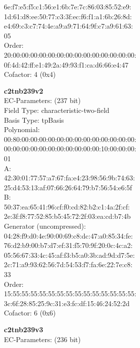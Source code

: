     6e:f7:e5:f5:c1:56:e1:6b:7e:7c:86:03:85:52:e9:\\
    1d:61:d8:ee:50:77:c3:3f:ec:f6:f1:a1:6b:26:8d:\\
    e4:69:c3:c7:74:4e:a9:a9:71:64:9f:c7:a9:61:63:\\
    05\\
Order: \\
    20:00:00:00:00:00:00:00:00:00:00:00:00:00:00:\\
    0f:4d:42:ff:e1:49:2a:49:93:f1:ca:d6:66:e4:47\\
Cofactor:  4 (0x4)\\
\item \textbf{ c2tnb239v2 }\\
EC-Parameters: (237 bit)\\
Field Type: characteristic-two-field\\
Basis Type: tpBasis\\
Polynomial:\\
    00:80:00:00:00:00:00:00:00:00:00:00:00:00:00:\\
    00:00:00:00:00:00:00:00:00:00:00:10:00:00:00:\\
    01\\
A:   \\
    42:30:01:77:57:a7:67:fa:e4:23:98:56:9b:74:63:\\
    25:d4:53:13:af:07:66:26:64:79:b7:56:54:e6:5f\\
B:   \\
    50:37:ea:65:41:96:cf:f0:cd:82:b2:c1:4a:2f:cf:\\
    2e:3f:f8:77:52:85:b5:45:72:2f:03:ea:cd:b7:4b\\
Generator (uncompressed):\\
    04:28:f9:d0:4e:90:00:69:c8:dc:47:a0:85:34:fe:\\
    76:d2:b9:00:b7:d7:ef:31:f5:70:9f:20:0c:4c:a2:\\
    05:56:67:33:4c:45:af:f3:b5:a0:3b:ad:9d:d7:5e:\\
    2c:71:a9:93:62:56:7d:54:53:f7:fa:6e:22:7e:c8:\\
    33\\
Order: \\
    15:55:55:55:55:55:55:55:55:55:55:55:55:55:55:\\
    3c:6f:28:85:25:9c:31:e3:fc:df:15:46:24:52:2d\\
Cofactor:  6 (0x6)\\
\item \textbf{ c2tnb239v3 }\\
EC-Parameters: (236 bit)\\
